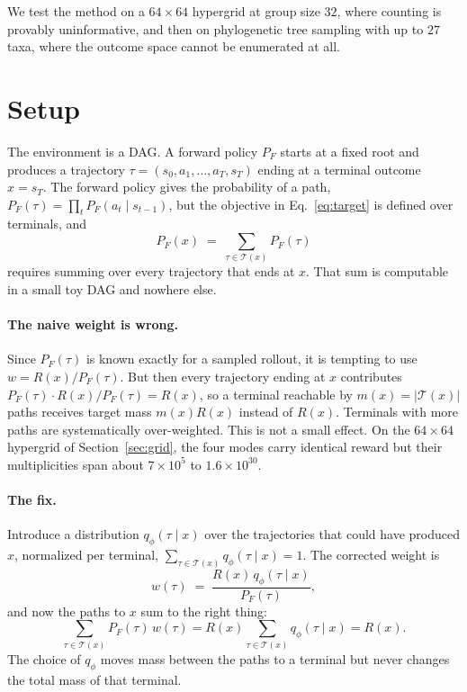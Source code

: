 \documentclass[11pt]{article}
\begin{document}
We test the method on a $64\times64$ hypergrid at group size $32$, where
counting is provably uninformative, and then on phylogenetic tree sampling with
up to $27$ taxa, where the outcome space cannot be enumerated at all.

\section{Setup}

The environment is a DAG. A forward policy $P_F$ starts at a fixed root and
produces a trajectory $\tau = (s_0, a_1, \dots, a_T, s_T)$ ending at a terminal
outcome $x = s_T$. The forward policy gives the probability of a path,
$P_F(\tau) = \prod_t P_F(a_t \mid s_{t-1})$, but the objective in
Eq.~\eqref{eq:target} is defined over terminals, and
\begin{equation}
P_F(x) \;=\; \sum_{\tau \in \mathcal{T}(x)} P_F(\tau)
\end{equation}
requires summing over every trajectory that ends at $x$. That sum is computable
in a small toy DAG and nowhere else.

\paragraph{The naive weight is wrong.}
Since $P_F(\tau)$ is known exactly for a sampled rollout, it is tempting to use
$w = R(x)/P_F(\tau)$. But then every trajectory ending at $x$ contributes
$P_F(\tau) \cdot R(x)/P_F(\tau) = R(x)$, so a terminal reachable by
$m(x) = |\mathcal{T}(x)|$ paths receives target mass $m(x)R(x)$ instead of
$R(x)$. Terminals with more paths are systematically over-weighted. This is not
a small effect. On the $64\times64$ hypergrid of Section~\ref{sec:grid}, the
four modes carry identical reward but their multiplicities span about
$7\times10^{5}$ to $1.6\times10^{30}$.

\paragraph{The fix.}
Introduce a distribution $q_\phi(\tau \mid x)$ over the trajectories that could
have produced $x$, normalized per terminal,
$\sum_{\tau \in \mathcal{T}(x)} q_\phi(\tau \mid x) = 1$. The corrected weight
is
\begin{equation}
w(\tau) \;=\; \frac{R(x)\, q_\phi(\tau \mid x)}{P_F(\tau)},
\label{eq:weight}
\end{equation}
and now the paths to $x$ sum to the right thing:
\begin{equation}
\sum_{\tau \in \mathcal{T}(x)} P_F(\tau)\, w(\tau)
= R(x) \sum_{\tau \in \mathcal{T}(x)} q_\phi(\tau \mid x) = R(x).
\end{equation}
The choice of $q_\phi$ moves mass between the paths to a terminal but never
changes the total mass of that terminal.
\end{document}
